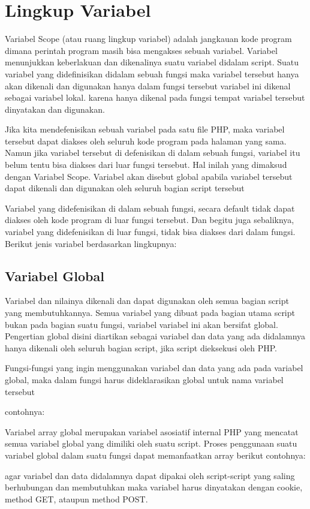 \section{Lingkup Variabel}
Variabel Scope (atau ruang lingkup variabel) adalah jangkauan kode program dimana perintah program masih bisa mengakses sebuah variabel. Variabel menunjukkan keberlakuan dan dikenalinya suatu variabel didalam script. Suatu variabel yang didefinisikan didalam sebuah fungsi maka variabel tersebut hanya akan dikenali dan digunakan hanya dalam fungsi tersebut variabel ini dikenal sebagai variabel lokal. karena hanya dikenal pada fungsi tempat variabel tersebut dinyatakan dan digunakan.

Jika kita mendefenisikan sebuah variabel pada satu file PHP, maka variabel tersebut dapat diakses oleh seluruh kode program pada halaman yang sama. Namun jika variabel tersebut di defenisikan di dalam sebuah fungsi, variabel itu belum tentu bisa diakses dari luar fungsi tersebut. Hal inilah yang dimaksud dengan Variabel Scope. Variabel akan disebut global apabila variabel tersebut dapat dikenali dan digunakan oleh seluruh bagian script tersebut

Variabel yang didefenisikan di dalam sebuah fungsi, secara default tidak dapat diakses oleh kode program di luar fungsi tersebut. Dan begitu juga sebaliknya, variabel yang didefenisikan di luar fungsi, tidak bisa diakses dari dalam fungsi. Berikut jenis variabel berdasarkan lingkupnya:

\subsection{Variabel Global}
Variabel dan nilainya dikenali dan dapat digunakan oleh semua bagian script yang membutuhkannya. Semua variabel yang dibuat pada bagian utama script bukan pada bagian suatu fungsi, variabel variabel ini akan bersifat global. Pengertian global disini diartikan sebagai variabel dan data yang ada didalamnya hanya dikenali oleh seluruh bagian script, jika script dieksekusi oleh PHP.

Fungsi-fungsi yang ingin menggunakan variabel dan data yang ada pada variabel global, maka dalam fungsi harus dideklarasikan global untuk nama variabel tersebut

contohnya:


Variabel array global merupakan variabel asosiatif internal PHP yang mencatat semua variabel global yang dimiliki oleh suatu script. Proses penggunaan suatu variabel global dalam suatu fungsi dapat memanfaatkan array  berikut contohnya:

agar variabel dan data didalamnya dapat dipakai oleh script-script yang saling berhubungan dan membutuhkan maka variabel harus dinyatakan dengan cookie, method GET, ataupun method POST.


